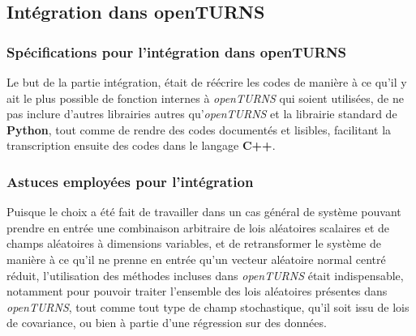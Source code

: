 \documentclass[a4paper,10pt]{article}
\begin{document}
\subsection{Intégration dans openTURNS}
\subsubsection{Spécifications pour l'intégration dans openTURNS}
Le but de la partie intégration, était de réécrire les codes de manière à ce qu'il y ait le plus possible de fonction internes à \textit{openTURNS} qui soient utilisées, de ne pas inclure d'autres librairies autres qu'\textit{openTURNS} et la librairie standard de \textbf{Python}, tout comme de rendre des codes documentés et lisibles, facilitant la transcription ensuite des codes dans le langage \textbf{C++}.

\subsubsection{Astuces employées pour l'intégration}
Puisque le choix a été fait de travailler dans un cas général de système pouvant prendre en entrée une combinaison arbitraire de lois aléatoires scalaires et de champs aléatoires à dimensions variables, et de retransformer le système de manière à ce qu'il ne prenne en entrée qu'un vecteur aléatoire normal centré réduit, l'utilisation des méthodes incluses dans \textit{openTURNS} était indispensable, notamment pour pouvoir traiter l’ensemble des lois aléatoires présentes dans \textit{openTURNS}, tout comme tout type de champ stochastique, qu'il soit issu de lois de covariance, ou bien à partie d'une régression sur des données.
\end{document}
